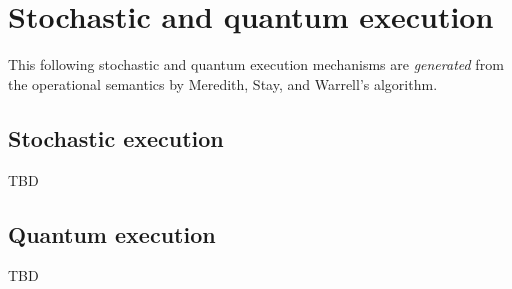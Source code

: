 \section{Stochastic and quantum execution}

This following stochastic and quantum execution mechanisms are
\emph{generated} from the operational semantics by Meredith, Stay, and
Warrell's algorithm.

\subsection{Stochastic execution}

TBD

\subsection{Quantum execution}

TBD
